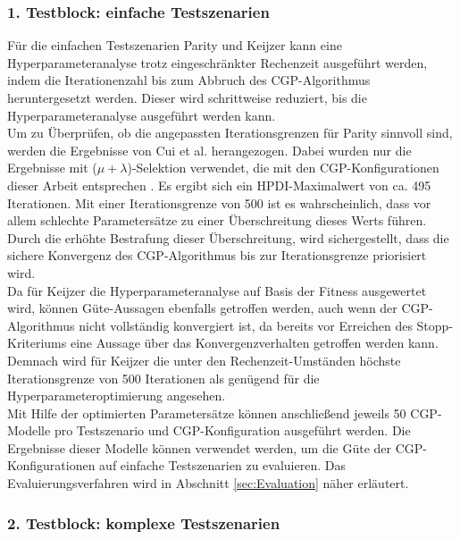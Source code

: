 \subsubsection{1. Testblock: einfache Testszenarien}
\label{subsub:ersterTestblock}

Für die einfachen Testszenarien Parity und Keijzer kann eine Hyperparameteranalyse trotz eingeschränkter Rechenzeit ausgeführt werden, indem die Iterationenzahl bis zum Abbruch des CGP-Algorithmus heruntergesetzt werden.
Dieser wird schrittweise reduziert, bis die Hyperparameteranalyse ausgeführt werden kann.\\
Um zu Überprüfen, ob die angepassten Iterationsgrenzen für Parity sinnvoll sind, werden die Ergebnisse von Cui et al. herangezogen. 
Dabei wurden nur die Ergebnisse mit ($\mu + \lambda$)-Selektion verwendet, die mit den CGP-Konfigurationen dieser Arbeit entsprechen \cite{cui_results}.
Es ergibt sich ein HPDI-Maximalwert von ca. 495 Iterationen. 
Mit einer Iterationsgrenze von 500 ist es wahrscheinlich, dass vor allem schlechte Parametersätze zu einer Überschreitung dieses Werts führen.
Durch die erhöhte Bestrafung dieser Überschreitung, wird sichergestellt, dass die sichere Konvergenz des CGP-Algorithmus bis zur Iterationsgrenze priorisiert wird.\\
Da für Keijzer die Hyperparameteranalyse auf Basis der Fitness ausgewertet wird, können Güte-Aussagen ebenfalls getroffen werden, auch wenn der CGP-Algorithmus nicht vollständig konvergiert ist, da bereits vor Erreichen des Stopp-Kriteriums eine Aussage über das Konvergenzverhalten getroffen werden kann.
Demnach wird für Keijzer die unter den Rechenzeit-Umständen höchste Iterationsgrenze von 500 Iterationen als genügend für die Hyperparameteroptimierung angesehen.\\

Mit Hilfe der optimierten Parametersätze können anschließend jeweils 50 CGP-Modelle pro Testszenario und CGP-Konfiguration ausgeführt werden.
Die Ergebnisse dieser Modelle können verwendet werden, um die Güte der CGP-Konfigurationen auf einfache Testszenarien zu evaluieren.
Das Evaluierungsverfahren wird in Abschnitt \ref{sec:Evaluation} näher erläutert.

\subsubsection{2. Testblock: komplexe Testszenarien}
\label{subsub:zweiterTestblock}

